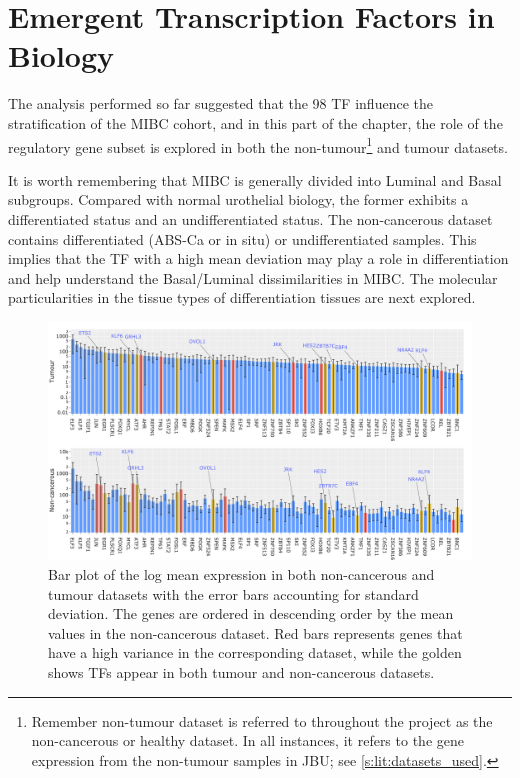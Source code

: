 \section{Emergent Transcription Factors in Biology} \label{s:N_I:sel_tfs_bio}

The analysis performed so far suggested that the 98 TF influence the stratification of the MIBC cohort, and in this part of the chapter, the role of the regulatory gene subset is explored in both the non-tumour\footnote{Remember non-tumour dataset is referred to throughout the project as the non-cancerous or healthy dataset. In all instances, it refers to the gene expression from the non-tumour samples in JBU; see \cref{s:lit:datasets_used}.} and tumour datasets.

It is worth remembering that MIBC is generally divided into Luminal and Basal subgroups. Compared with normal urothelial biology, the former exhibits a differentiated status and an undifferentiated status. The non-cancerous dataset contains differentiated (ABS-Ca or in situ) or undifferentiated samples. This implies that the TF with a high mean deviation may play a role in differentiation and help understand the Basal/Luminal dissimilarities in MIBC. The molecular particularities in the tissue types of differentiation tissues are next explored.

\begin{figure}[!b]   
    \centering
    \includegraphics[width=1.0\textwidth,height=1.0\textheight,keepaspectratio]{Sections/Network_I/Resources/selective_pruning/sel_tfs/sel_tfs_var_tum_healthy.png}
      \caption[Mean expression of the 98 TF in tumour and healthy samples]{Bar plot of the log mean expression in both non-cancerous and tumour datasets with the error bars accounting for standard deviation. The genes are ordered in descending order by the mean values in the non-cancerous dataset. Red bars represents genes that have a high variance in the corresponding dataset, while the golden shows TFs appear in both tumour and non-cancerous datasets.}
    \label{fig:N_I:sel_tfs_var}
\end{figure}

